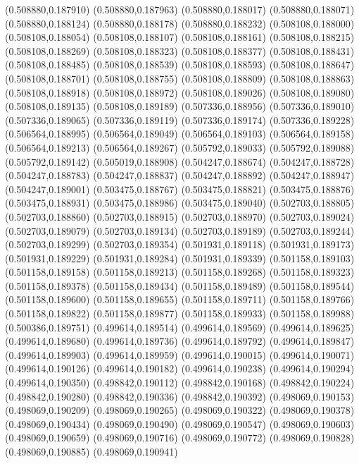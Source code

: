(0.508880,0.187910)
(0.508880,0.187963)
(0.508880,0.188017)
(0.508880,0.188071)
(0.508880,0.188124)
(0.508880,0.188178)
(0.508880,0.188232)
(0.508108,0.188000)
(0.508108,0.188054)
(0.508108,0.188107)
(0.508108,0.188161)
(0.508108,0.188215)
(0.508108,0.188269)
(0.508108,0.188323)
(0.508108,0.188377)
(0.508108,0.188431)
(0.508108,0.188485)
(0.508108,0.188539)
(0.508108,0.188593)
(0.508108,0.188647)
(0.508108,0.188701)
(0.508108,0.188755)
(0.508108,0.188809)
(0.508108,0.188863)
(0.508108,0.188918)
(0.508108,0.188972)
(0.508108,0.189026)
(0.508108,0.189080)
(0.508108,0.189135)
(0.508108,0.189189)
(0.507336,0.188956)
(0.507336,0.189010)
(0.507336,0.189065)
(0.507336,0.189119)
(0.507336,0.189174)
(0.507336,0.189228)
(0.506564,0.188995)
(0.506564,0.189049)
(0.506564,0.189103)
(0.506564,0.189158)
(0.506564,0.189213)
(0.506564,0.189267)
(0.505792,0.189033)
(0.505792,0.189088)
(0.505792,0.189142)
(0.505019,0.188908)
(0.504247,0.188674)
(0.504247,0.188728)
(0.504247,0.188783)
(0.504247,0.188837)
(0.504247,0.188892)
(0.504247,0.188947)
(0.504247,0.189001)
(0.503475,0.188767)
(0.503475,0.188821)
(0.503475,0.188876)
(0.503475,0.188931)
(0.503475,0.188986)
(0.503475,0.189040)
(0.502703,0.188805)
(0.502703,0.188860)
(0.502703,0.188915)
(0.502703,0.188970)
(0.502703,0.189024)
(0.502703,0.189079)
(0.502703,0.189134)
(0.502703,0.189189)
(0.502703,0.189244)
(0.502703,0.189299)
(0.502703,0.189354)
(0.501931,0.189118)
(0.501931,0.189173)
(0.501931,0.189229)
(0.501931,0.189284)
(0.501931,0.189339)
(0.501158,0.189103)
(0.501158,0.189158)
(0.501158,0.189213)
(0.501158,0.189268)
(0.501158,0.189323)
(0.501158,0.189378)
(0.501158,0.189434)
(0.501158,0.189489)
(0.501158,0.189544)
(0.501158,0.189600)
(0.501158,0.189655)
(0.501158,0.189711)
(0.501158,0.189766)
(0.501158,0.189822)
(0.501158,0.189877)
(0.501158,0.189933)
(0.501158,0.189988)
(0.500386,0.189751)
(0.499614,0.189514)
(0.499614,0.189569)
(0.499614,0.189625)
(0.499614,0.189680)
(0.499614,0.189736)
(0.499614,0.189792)
(0.499614,0.189847)
(0.499614,0.189903)
(0.499614,0.189959)
(0.499614,0.190015)
(0.499614,0.190071)
(0.499614,0.190126)
(0.499614,0.190182)
(0.499614,0.190238)
(0.499614,0.190294)
(0.499614,0.190350)
(0.498842,0.190112)
(0.498842,0.190168)
(0.498842,0.190224)
(0.498842,0.190280)
(0.498842,0.190336)
(0.498842,0.190392)
(0.498069,0.190153)
(0.498069,0.190209)
(0.498069,0.190265)
(0.498069,0.190322)
(0.498069,0.190378)
(0.498069,0.190434)
(0.498069,0.190490)
(0.498069,0.190547)
(0.498069,0.190603)
(0.498069,0.190659)
(0.498069,0.190716)
(0.498069,0.190772)
(0.498069,0.190828)
(0.498069,0.190885)
(0.498069,0.190941)
